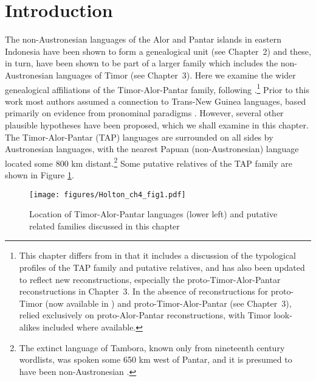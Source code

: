 
 

\section{Introduction} \label{sec:4:1}

\hypertarget{Toc376958109}{}The non-Austronesian languages of the Alor and Pantar islands in eastern Indonesia have been shown to form a genealogical unit (see Chapter~2) and these, in turn, have been shown to be part of a larger family which includes the non-Austronesian languages of Timor (see Chapter~3). Here we examine the wider genealogical affiliations of the Timor-Alor-Pantar family, following \citet{RobinsonEtAl2012reassessing}.\footnote{This chapter differs from \citet{RobinsonEtAl2012reassessing} in that it includes a discussion of the typological profiles of the TAP family and putative relatives, and has also been updated to reflect new reconstructions, especially the proto-Timor-Alor-Pantar reconstructions in Chapter~3. In the absence of reconstructions for proto-Timor (now available in \citealt{SchapperEtAl2012historical}) and proto-Timor-Alor-Pantar (see Chapter~3), \citet{RobinsonEtAl2012reassessing} relied exclusively on proto-Alor-Pantar reconstructions, with Timor look-alikes included
where available. }
Prior to this work most authors assumed a connection to Trans-New Guinea languages, based primarily on evidence from pronominal paradigms \citep{Ross2005}. However, several other plausible hypotheses have been proposed, which we shall examine in this chapter. The Timor-Alor-Pantar (TAP) languages are surrounded on all sides by Austronesian languages, with the nearest Papuan (non-Austronesian) language located some 800 km distant.\footnote{The extinct language of Tambora, known only from nineteenth century wordlists, was spoken some 650 km west of Pantar, and it is presumed to have been non-Austronesian \citep{Donohue2007tambora}.} Some putative relatives of the TAP family are shown in Figure \ref{fig:4:1}.

\begin{figure}[h]
\centering
\texttt{[image: figures/Holton\_ch4\_fig1.pdf]}
\caption{Location of Timor-Alor-Pantar languages (lower left) and putative related families discussed in this chapter}
\label{fig:4:1}
\end{figure}

